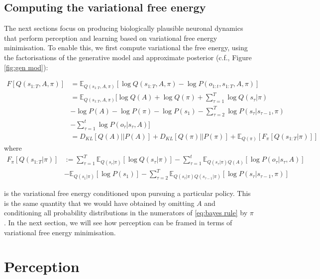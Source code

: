 \documentclass[review,12pt,authoryear]{elsarticle}
\newcommand{\E}{\mathbb E}
\begin{document}
\subsection{Computing the variational free energy}

The next sections focus on producing biologically plausible neuronal dynamics that perform perception and learning based on variational free energy minimisation. To enable this, we first compute variational the free energy, using the factorisations of the generative model and approximate posterior (c.f., Figure \ref{fig:gen mod}):

  	\begin{equation}
  	\label{eq: computing VFE}
  	    \begin{split}
  	        F[Q(s_{1:T},A, \pi)]&= \E_{Q(s_{1:T},A, \pi)}[\log Q(s_{1:T},A, \pi) - \log P(o_{1:t},s_{1:T},A, \pi)] \\
  	        &= \E_{Q(s_{1:T},A, \pi)}[\log Q(A) +  \log Q(\pi)+\sum_{\tau = 1}^T  \log Q(s_\tau|\pi) \\
  	        &-\log P(A) -\log P(\pi)- \log P(s_1)- \sum_{\tau =2}^T\log P(s_\tau |s_{\tau-1},\pi)\\
  	        &-\sum_{\tau = 1}^t \log P(o_{\tau}|s_{\tau},A)] \\
  	        &=D_{KL}[Q(A)||P(A)]+D_{KL}[Q(\pi)||P(\pi)]+\E_{Q(\pi)}[F_\pi[Q(s_{1:T}|\pi)]]
  	    \end{split}
  	\end{equation}
where
\begin{equation}
  	\label{eq: VFE_pi}
  	    \begin{split}
  	        F_\pi[Q(s_{1:T}|\pi)] & := \sum_{\tau =1}^T\E_{Q(s_\tau |\pi)}[\log Q(s_\tau |\pi)] -\sum_{\tau = 1}^t \E_{Q(s_\tau |\pi)Q(A)}[\log P(o_{\tau}|s_{\tau},A)] \\
  	        &-\E_{Q(s_1 |\pi)}[\log P(s_1)]-\sum_{\tau =2}^T \E_{Q(s_\tau |\pi)Q(s_{\tau-1} |\pi)}[\log P(s_\tau |s_{\tau-1},\pi)]
      	    \end{split}
  	\end{equation}
  	
is the variational free energy conditioned upon pursuing a particular policy. This is the same quantity that we would have obtained by omitting $A$ and conditioning all probability distributions in the numerators of \eqref{eq:bayes rule} by $\pi$. In the next section, we will see how perception can be framed in terms of variational free energy minimisation.

\section{Perception}
\end{document}
